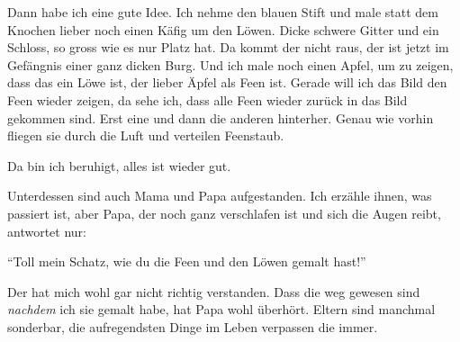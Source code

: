 Dann habe ich eine gute Idee. Ich nehme den blauen Stift und male statt dem Knochen lieber noch einen Käfig um den Löwen. Dicke schwere Gitter und ein Schloss, so gross wie es nur Platz hat. Da kommt der nicht raus, der ist jetzt im Gefängnis einer ganz dicken Burg. Und ich male noch einen Apfel, um zu zeigen, dass das ein Löwe ist, der lieber Äpfel als Feen ist. Gerade will ich das Bild den Feen wieder zeigen, da sehe ich, dass alle Feen wieder zurück in das Bild gekommen sind. Erst eine und dann die anderen hinterher. Genau wie vorhin fliegen sie durch die Luft und verteilen Feenstaub. 

Da bin ich beruhigt, alles ist wieder gut.

Unterdessen sind auch Mama und Papa aufgestanden. Ich erzähle ihnen, was passiert ist, aber Papa, der noch ganz verschlafen ist und sich die Augen reibt, antwortet nur: 

\enquote{Toll mein Schatz, wie du die Feen und den Löwen gemalt hast!} 

Der hat mich wohl gar nicht richtig verstanden. Dass die weg gewesen sind \emph{nachdem} ich sie gemalt habe, hat Papa wohl überhört. Eltern sind manchmal sonderbar, die aufregendsten Dinge im Leben verpassen die immer. \hfill {\color{DeepPink}\decofourleft}
